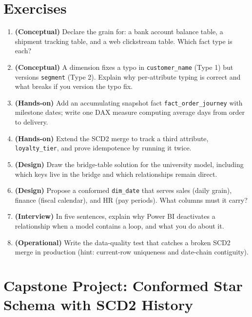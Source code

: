\section{Exercises}
\begin{enumerate}
    \item \textbf{(Conceptual)} Declare the grain for: a bank account balance table, a shipment tracking table, and a web clickstream table. Which fact type is each?
    \item \textbf{(Conceptual)} A dimension fixes a typo in \texttt{customer\_name} (Type 1) but versions \texttt{segment} (Type 2). Explain why per-attribute typing is correct and what breaks if you version the typo fix.
    \item \textbf{(Hands-on)} Add an accumulating snapshot fact \texttt{fact\_order\_journey} with milestone dates; write one DAX measure computing average days from order to delivery.
    \item \textbf{(Hands-on)} Extend the SCD2 merge to track a third attribute, \texttt{loyalty\_tier}, and prove idempotence by running it twice.
    \item \textbf{(Design)} Draw the bridge-table solution for the university model, including which keys live in the bridge and which relationships remain direct.
    \item \textbf{(Design)} Propose a conformed \texttt{dim\_date} that serves sales (daily grain), finance (fiscal calendar), and HR (pay periods). What columns must it carry?
    \item \textbf{(Interview)} In five sentences, explain why Power BI deactivates a relationship when a model contains a loop, and what you do about it.
    \item \textbf{(Operational)} Write the data-quality test that catches a broken SCD2 merge in production (hint: current-row uniqueness and date-chain contiguity).
\end{enumerate}

\section{Capstone Project: Conformed Star Schema with SCD2 History}\label{sec:ch7-capstone}

